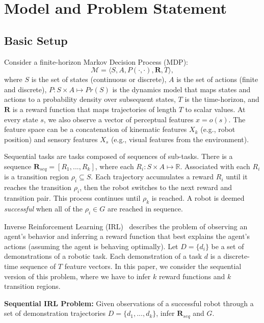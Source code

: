 \section{Model and Problem Statement}

\subsection{Basic Setup}
Consider a finite-horizon Markov Decision Process (MDP): \[\mathcal{M} = \langle S,A,P(\cdot,\cdot),\mathbf{R},T \rangle,\] where $S$ is the set of states (continuous or discrete), $A$ is the set of actions (finite and discrete), $P: S \times A \mapsto Pr(S)$ is the dynamics model that maps states and actions to a probability density over subsequent states, $T$ is the time-horizon, and $\mathbf{R}$ is a reward function that maps trajectories of length $T$ to scalar values. At every state $s$, we also observe a vector of perceptual features $x = o(s)$.
The feature space can be a concatenation of kinematic features $X_{k}$ (e.g., robot position) and sensory features $X_{s}$ (e.g., visual features from the environment).

Sequential tasks are tasks composed of sequences of sub-tasks. There is a sequence $\mathbf{R}_{seq}=[R_1,...,R_k]$, where each $R_i: S \times A \mapsto \mathbb{R}$. Associated with each $R_i$ is a transition region $\rho_i \subseteq S$. 
Each trajectory accumulates a reward $R_i$ until it reaches the transition $\rho_i$, then the robot switches to the next reward and transition pair.
This process continues until $\rho_k$ is reached.
A robot is deemed \emph{successful} when all of the $\rho_i \in G$ are reached in sequence.

Inverse Reinforcement Learning (IRL)~\cite{ng2000algorithms} describes the problem of observing an agent's behavior and inferring a reward function that best explains the agent's actions (assuming the agent is behaving optimally).
Let $D=\{d_i\}$ be a set of demonstrations of a robotic task.
Each demonstration of a task $d$ is a discrete-time sequence of $T$ feature vectors.
In this paper, we consider the sequential version of this problem, where we have to infer $k$ reward functions and $k$ transition regions.

\vspace{0.25em} \noindent \textbf{Sequential IRL Problem: } Given observations of a successful robot through a set of demonstration trajectories $D = \{d_1,...,d_k\}$, infer $\mathbf{R}_{seq}$ and $G$.

